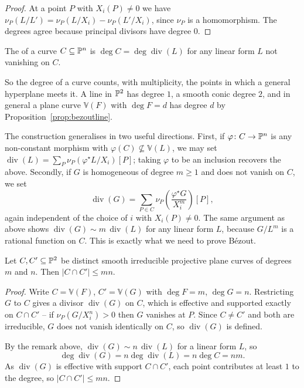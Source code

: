 \documentclass[a4paper]{scrartcl}
\newcommand{\V}{\mathbb{V}}
\DeclareMathOperator{\Divv}{div}
\begin{document}
\begin{proof}
	At a point $P$ with $X_i(P)\neq0$ we have $\nu_P(L/L') = \nu_P(L/X_i) - \nu_P(L'/X_i)$, since $\nu_P$ is a homomorphism. The degrees agree because principal divisors have degree $0$.
\end{proof}

\begin{definition}
	The  of a curve $C \subseteq \mathbb{P}^n$ is $\deg C = \deg\Divv(L)$ for any linear form $L$ not vanishing on $C$.
\end{definition}

So the degree of a curve counts, with multiplicity, the points in which a general hyperplane meets it. A line in $\mathbb{P}^2$ has degree $1$, a smooth conic degree $2$, and in general a plane curve $\V(F)$ with $\deg F = d$ has degree $d$ by Proposition~\ref{prop:bezoutline}.

The construction generalises in two useful directions. First, if $\varphi \colon C \to \mathbb{P}^n$ is any non-constant morphism with $\varphi(C)\not\subseteq \V(L)$, we may set $\Divv(L) = \sum_P \nu_P(\varphi^\star L/X_i)[P]$; taking $\varphi$ to be an inclusion recovers the above. Secondly, if $G$ is homogeneous of degree $m \geq 1$ and does not vanish on $C$, we set
$$\Divv(G) = \sum_{P \in C}\nu_P\!\left(\frac{\varphi^\star G}{X_i^m}\right)[P],$$
again independent of the choice of $i$ with $X_i(P)\neq 0$. The same argument as above shows $\Divv(G) \sim m\,\Divv(L)$ for any linear form $L$, because $G/L^m$ is a rational function on $C$. This is exactly what we need to prove B\'ezout.

\begin{theorem}\label{thm:weakbezout}
	Let $C, C' \subseteq \mathbb{P}^2$ be distinct smooth irreducible projective plane curves of degrees $m$ and $n$. Then $|C\cap C'| \leq mn$.
\end{theorem}

\begin{proof}
	Write $C = \V(F)$, $C' = \V(G)$ with $\deg F = m$, $\deg G = n$. Restricting $G$ to $C$ gives a divisor $\Divv(G)$ on $C$, which is effective and supported exactly on $C \cap C'$ -- if $\nu_P(G/X_i^n) > 0$ then $G$ vanishes at $P$. Since $C \neq C'$ and both are irreducible, $G$ does not vanish identically on $C$, so $\Divv(G)$ is defined.

	By the remark above, $\Divv(G) \sim n\,\Divv(L)$ for a linear form $L$, so
	$$\deg\Divv(G) = n\deg\Divv(L) = n\deg C = nm.$$
	As $\Divv(G)$ is effective with support $C\cap C'$, each point contributes at least $1$ to the degree, so $|C\cap C'| \leq mn$.
\end{proof}
\end{document}
